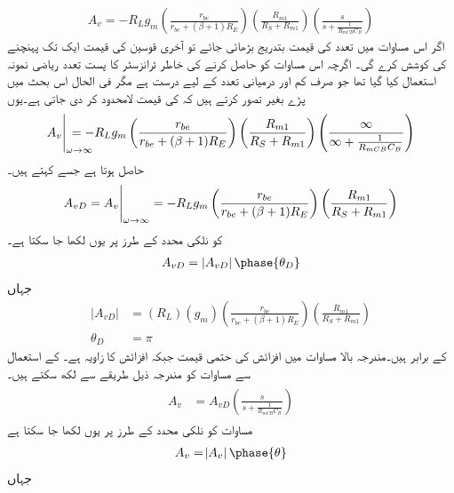 \begin{align} \label{مساوات_تعددی_ردعمل_ایمپلیفائر_بمع_قابو_کپیسٹر}
A_v=-R_L  g_m \left(\frac{r_{be}}{r_{be}+(\beta+1)R_E} \right ) \left (\frac{R_{m1}}{R_S+R_{m1}} \right ) \left(\frac{s}{s+\frac{1}{R_{mCB} C_B}} \right )
\end{align}
اگر اس مساوات میں تعدد  کی قیمت بتدریج بڑھائی جائے تو آخری قوسین کی قیمت ایک   تک پہنچنے کی کوشش کرے گی۔ اگرچہ اس مساوات کو حاصل کرنے کی خاطر ٹرانزسٹر کا پست تعدد ریاضی نمونہ استعمال کیا گیا تھا جو صرف کم  اور درمیانی تعدد کے لیے درست ہے مگر فی الحال اس بحث میں پڑے بغیر تصور کرتے ہیں کہ  کی قیمت لامحدود کر دی جاتی ہے۔یوں
\begin{align*}
\eval{A_v}_{\omega \to \infty} \hspace{-2em}=-R_L g_m  \left(\frac{r_{be}}{r_{be}+(\beta+1)R_E} \right ) \left (\frac{R_{m1}}{R_S+R_{m1}} \right ) \left(\frac{\infty}{\infty+\frac{1}{R_{mCB} C_B}} \right )
\end{align*}
حاصل ہوتا ہے جسے   کہتے ہیں۔
\begin{align} \label{مساوات_تعددی_ردعمل_قابو_کپیسٹر_لامحدود_تعدد}
A_{vD}=\eval{A_v}_{\omega \to \infty}=-R_L g_m  \left(\frac{r_{be}}{r_{be}+(\beta+1)R_E} \right ) \left (\frac{R_{m1}}{R_S+R_{m1}} \right ) 
\end{align}
 کو نلکی محدد  کے طرز پر یوں لکھا جا سکتا ہے۔
\begin{align}
A_{vD} = \left | {A_{vD}}  \right | \phase{ \theta_D}
\end{align}
جہاں
\begin{align}
\left | A_{vD} \right | &= \left (R_L \right ) \left (g_m \right ) \left (\frac{r_{be}}{r_{be}+\left(\beta+1 \right ) R_E} \right ) \left (\frac{R_{m1}}{R_S+R_{m1}} \right )\\
\theta_D &=\pi
\end{align}
کے برابر ہیں۔مندرجہ بالا مساوات میں   افزائش کی حتمی قیمت جبکہ   افزائش کا زاویہ ہے۔   کے استعمال سے مساوات   کو مندرجہ ذیل طریقے سے لکھ سکتے ہیں۔
\begin{gather} \label{مساوات_تعددی_ردعمل_قابو_کپیسٹر_لامحدود_کا_استعمال}
\begin{aligned}
A_v&=A_{vD} \left(\frac{s}{s+\frac{1}{R_{mCB} C_B}} \right )
\end{aligned}
\end{gather}
مساوات  کو نلکی محدد کے طرز پر یوں لکھا جا سکتا ہے
\begin{align}
A_v =\abs{A_{v}} \phase{\theta}
\end{align}
جہاں

